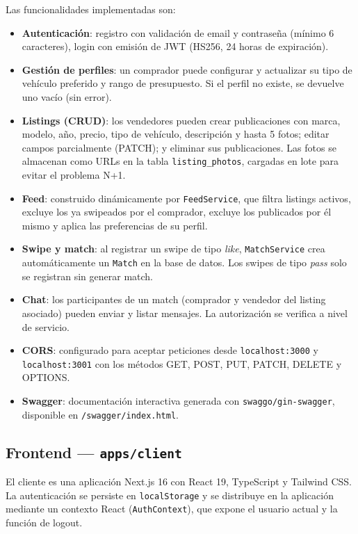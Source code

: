\documentclass[12pt,a4paper]{article}
\begin{document}
Las funcionalidades implementadas son:
\begin{itemize}
  \item \textbf{Autenticación}: registro con validación de email y contraseña (mínimo 6
        caracteres), login con emisión de JWT (HS256, 24 horas de expiración).
  \item \textbf{Gestión de perfiles}: un comprador puede configurar y actualizar su tipo de
        vehículo preferido y rango de presupuesto. Si el perfil no existe, se devuelve uno vacío
        (sin error).
  \item \textbf{Listings (CRUD)}: los vendedores pueden crear publicaciones con marca, modelo,
        año, precio, tipo de vehículo, descripción y hasta 5 fotos; editar campos parcialmente
        (PATCH); y eliminar sus publicaciones. Las fotos se almacenan como URLs en la tabla
        \texttt{listing\_photos}, cargadas en lote para evitar el problema N+1.
  \item \textbf{Feed}: construido dinámicamente por \texttt{FeedService}, que filtra listings
        activos, excluye los ya swipeados por el comprador, excluye los publicados por él mismo y
        aplica las preferencias de su perfil.
  \item \textbf{Swipe y match}: al registrar un swipe de tipo \emph{like}, \texttt{MatchService}
        crea automáticamente un \texttt{Match} en la base de datos. Los swipes de tipo
        \emph{pass} solo se registran sin generar match.
  \item \textbf{Chat}: los participantes de un match (comprador y vendedor del listing asociado)
        pueden enviar y listar mensajes. La autorización se verifica a nivel de servicio.
  \item \textbf{CORS}: configurado para aceptar peticiones desde \texttt{localhost:3000} y
        \texttt{localhost:3001} con los métodos GET, POST, PUT, PATCH, DELETE y OPTIONS.
  \item \textbf{Swagger}: documentación interactiva generada con \texttt{swaggo/gin-swagger},
        disponible en \texttt{/swagger/index.html}.
\end{itemize}

\subsection{Frontend --- \texttt{apps/client}}

El cliente es una aplicación Next.js 16 con React 19, TypeScript y Tailwind CSS. La autenticación
se persiste en \texttt{localStorage} y se distribuye en la aplicación mediante un contexto React
(\texttt{AuthContext}), que expone el usuario actual y la función de logout.
\end{document}
